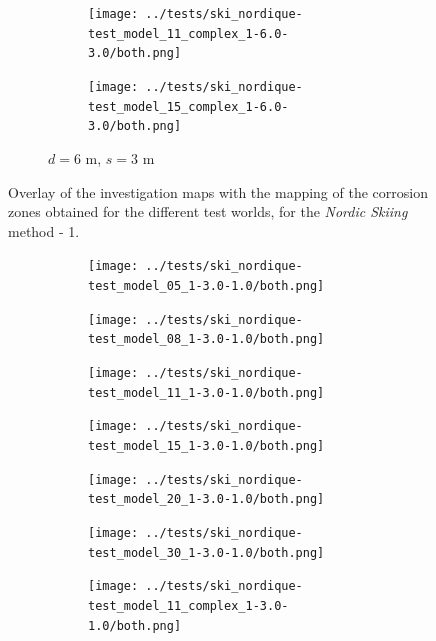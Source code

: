 \begin{theappendices}
\begin{figure}[H]
\begin{subfigure}[t]{\linewidth}
\begin{subfigure}[t]{0.11\linewidth}
					\texttt{[image: ../tests/ski\_nordique-test\_model\_11\_complex\_1-6.0-3.0/both.png]}
				\end{subfigure}
				\hfill
				\begin{subfigure}[t]{0.11\linewidth}
					\texttt{[image: ../tests/ski\_nordique-test\_model\_15\_complex\_1-6.0-3.0/both.png]}
				\end{subfigure}
				\caption{$d = 6$ m, $s = 3$ m}
			\end{subfigure}
			\caption{Overlay of the investigation maps with the mapping of the corrosion zones obtained for the different test worlds, for the \textit{Nordic Skiing} method - 1.}
			\label{fig:ski_nordique_resultats}
		\end{figure}

		\begin{figure}[H]
			\centering
			\begin{subfigure}[t]{\linewidth}
				\centering
				\begin{subfigure}[t]{0.11\linewidth}
					\texttt{[image: ../tests/ski\_nordique-test\_model\_05\_1-3.0-1.0/both.png]}
				\end{subfigure}
				\hfill
				\begin{subfigure}[t]{0.11\linewidth}
					\texttt{[image: ../tests/ski\_nordique-test\_model\_08\_1-3.0-1.0/both.png]}
				\end{subfigure}
				\hfill
				\begin{subfigure}[t]{0.11\linewidth}
					\texttt{[image: ../tests/ski\_nordique-test\_model\_11\_1-3.0-1.0/both.png]}
				\end{subfigure}
				\hfill
				\begin{subfigure}[t]{0.11\linewidth}
					\texttt{[image: ../tests/ski\_nordique-test\_model\_15\_1-3.0-1.0/both.png]}
				\end{subfigure}
				\hfill
				\begin{subfigure}[t]{0.11\linewidth}
					\texttt{[image: ../tests/ski\_nordique-test\_model\_20\_1-3.0-1.0/both.png]}
				\end{subfigure}
				\hfill
				\begin{subfigure}[t]{0.11\linewidth}
					\texttt{[image: ../tests/ski\_nordique-test\_model\_30\_1-3.0-1.0/both.png]}
				\end{subfigure}
				\hfill
				\begin{subfigure}[t]{0.11\linewidth}
					\texttt{[image: ../tests/ski\_nordique-test\_model\_11\_complex\_1-3.0-1.0/both.png]}
				\end{subfigure}
				\hfill

\end{subfigure}
\end{figure}
\end{theappendices}
